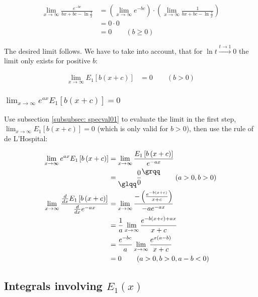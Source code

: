 \documentclass[bibliography=totocnumbered]{scrartcl}
\begin{document}
	\begin{align}
	\lim_{x\rightarrow\infty}\frac{e^{-bc}}{bx+bc-\ln{\frac{1}{x}}}&=\left(\lim_{x\rightarrow\infty}e^{-bc}\right)\cdot\left(\lim_{x\rightarrow\infty}\frac{1}{bx+bc-\ln{\frac{1}{x}}}\right)\\
	&=0\cdot0\\
	&=0\qquad\left(b\geq0\right)
	\end{align}
	
	The desired limit follows. We have to take into account, that for $\ln{t}\overset{t\rightarrow1}{\longrightarrow}0$ the limit only exists for positive $b$:
	
	\begin{align}
		\lim_{x\rightarrow\infty}E_1\left[b\left(x+c\right)\right]&=0\qquad\left(b>0\right)
	\end{align}

	\subsubsection[A limit of E1, involving the exponential function]{$\lim_{x\rightarrow\infty}e^{ax}E_1\left[b\left(x+c\right)\right]=0$}
	\label{subsubsec: specval02}
	
	Use subsection \ref{subsubsec: specval01} to evaluate the limit in the first step, $\lim_{x\rightarrow\infty}E_1\left[b\left(x+c\right)\right]=0$ (which is only valid for $b>0$), then use the rule of de L'Hospital:
	
	\begin{align}
		\lim_{x\rightarrow\infty}e^{ax}E_1\left[b\left(x+c\right)\right]&=\lim_{x\rightarrow\infty}\frac{E_1\left[b\left(x+c\right)\right]}{e^{-ax}}\\
		&=\text{\raisebox{-9pt}{\glqq}}\frac{0}{0}\text{\raisebox{9pt}{\grqq}}\qquad\left(a>0, b>0\right)\\
		\lim_{x\rightarrow\infty}\frac{\frac{d}{dx}E_1\left[b\left(x+c\right)\right]}{\frac{d}{dx}e^{-ax}}&=\lim_{x\rightarrow\infty}\frac{-\left(\frac{e^{-b\left(x+c\right)}}{x+c}\right)}{-ae^{-ax}}\\
		&=\frac{1}{a}\lim_{x\rightarrow\infty}\frac{e^{-b\left(x+c\right)+ax}}{x+c}\\
		&=\frac{e^{-bc}}{a}\lim_{x\rightarrow\infty}\frac{e^{x\left(a-b\right)}}{x+c}\\
		&=0\qquad\left(a>0, b>0, a-b<0\right)
	\end{align}
	

	\subsection[Integrals involving E1(x)]{Integrals involving $E_1\left(x\right)$}
	
\end{document}
